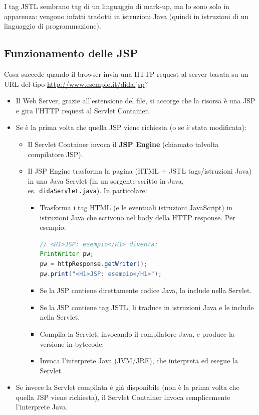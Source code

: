 I tag JSTL sembrano tag di un linguaggio di mark-up, ma lo sono solo in apparenza: vengono infatti tradotti in istruzioni Java (quindi in istruzioni di un linguaggio di programmazione).

\subsection{Funzionamento delle JSP}

Cosa succede quando il browser invia una HTTP request al server basata su un URL del tipo \url{http://www.esempio.it/dida.jsp}?

\begin{itemize}
    \item Il Web Server, grazie all'estensione del file, si accorge che la risorsa è una JSP e gira l'HTTP request al Servlet Container.
    \item Se è la prima volta che quella JSP viene richiesta (o se è stata modificata):
    \begin{itemize}
        \item Il Servlet Container invoca il \textbf{JSP Engine} (chiamato talvolta compilatore JSP).
        \item Il JSP Engine trasforma la pagina (HTML + JSTL tags/istruzioni Java) in una Java Servlet (in un sorgente scritto in Java, es.\ \texttt{didaServlet.java}). In particolare:
        \begin{itemize}
            \item Trasforma i tag HTML (e le eventuali istruzioni JavaScript) in istruzioni Java che scrivono nel body della HTTP response. Per esempio:
\begin{lstlisting}[language=Java]
// <H1>JSP: esempio</H1> diventa:
PrintWriter pw;
pw = httpResponse.getWriter();
pw.print("<H1>JSP: esempio</H1>");
\end{lstlisting}
            \item Se la JSP contiene direttamente codice Java, lo include nella Servlet.
            \item Se la JSP contiene tag JSTL, li traduce in istruzioni Java e le include nella Servlet.
            \item Compila la Servlet, invocando il compilatore Java, e produce la versione in bytecode.
            \item Invoca l'interprete Java (JVM/JRE), che interpreta ed esegue la Servlet.
        \end{itemize}
    \end{itemize}
    \item Se invece la Servlet compilata è già disponibile (non è la prima volta che quella JSP viene richiesta), il Servlet Container invoca semplicemente l'interprete Java.
\end{itemize}

